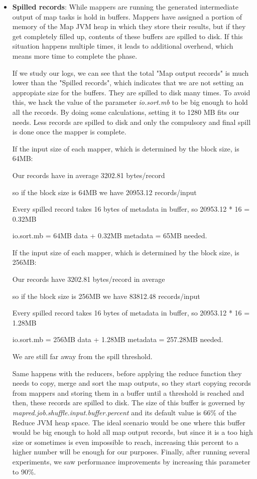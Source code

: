 \begin{itemize}
\item \textbf{Spilled records}: While mappers are running the generated intermediate output of map tasks is hold in buffers. Mappers have assigned a portion of memory of the Map JVM heap in which they store their results, but if they get completely filled up, contents of these buffers are spilled to disk. If this situation happens multiple times, it leads to additional overhead, which means more time to complete the phase. 
\par
If we study our logs, we can see that the total "Map output records" is much lower than the "Spilled records", which indicates that we are not setting an appropiate size for the buffers. They are spilled to disk many times. To avoid this, we hack the value of the parameter \textit{io.sort.mb} to be big enough to hold all the records. By doing some calculations, setting it to 1280 MB fits our needs. Less records are spilled to disk and only the compulsory and final spill is done once the mapper is complete.
\par
If the input size of each mapper, which is determined by the block size, is 64MB:
\par
\centerline{Our records have in average 3202.81 bytes/record}
\centerline{so if the block size is 64MB we have 20953.12 records/input}
\centerline{Every spilled record takes 16 bytes of metadata in buffer, so 20953.12 * 16 = 0.32MB}
\centerline{io.sort.mb = 64MB data + 0.32MB metadata = 65MB needed.}
\par
If the input size of each mapper, which is determined by the block size, is 256MB:
\par
\centerline{Our records have 3202.81 bytes/record in average}
\centerline{so if the block size is 256MB we have 83812.48 records/input}
\centerline{Every spilled record takes 16 bytes of metadata in buffer, so 20953.12 * 16 = 1.28MB}
\centerline{io.sort.mb = 256MB data + 1.28MB metadata = 257.28MB needed.}
\bigskip
\par
We are still far away from the spill threshold. 
\par
{}
\par
Same happens with the reducers, before applying the reduce function they needs to copy, merge and sort the map outputs, so they start copying records from mappers and storing them in a buffer until a threshold is reached and then, these records are spilled to disk. The size of this buffer is governed by \textit{mapred.job.shuffle.input.buffer.percent} and its default value is 66\% of the Reduce JVM heap space. The ideal scenario would be one where this buffer would be big enough to hold all map output records, but since it is a too high size or sometimes is even impossible to reach, increasing this percent to a higher number will be enough for our purposes. Finally, after running several experiments, we saw performance improvements by increasing this parameter to 90\%.

\end{itemize}

